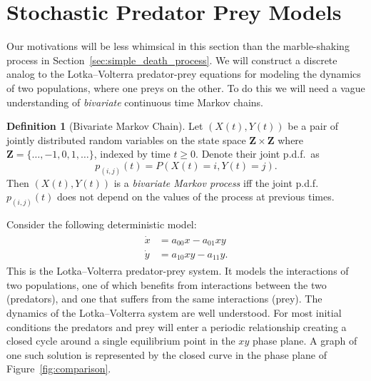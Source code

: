 \documentclass[12pt]{article}
\theoremstyle{definition}
\newtheorem{defn}{Definition}
\begin{document}
\section{Stochastic Predator Prey Models}
\label{sec:stochastic_predator_prey}

Our motivations will be less whimsical in this section than the marble-shaking
process in Section~\ref{sec:simple_death_process}. We will construct a discrete
analog to the Lotka--Volterra predator-prey equations for modeling the dynamics
of two populations, where one preys on the other. To do this we will need a
vague understanding of \emph{bivariate} continuous time Markov chains.

\begin{defn}[Bivariate Markov Chain]
    \label{defn:bivariate-process}
    Let $(X(t), Y(t))$ be a pair of jointly distributed random variables on the
    state space $\mathbf{Z} \times \mathbf{Z}$ where $\mathbf{Z} = \{\dots, -1,
    0, 1, \dots\}$, indexed by time $t \geq 0$.
    Denote their joint p.d.f.~as $$p_{(i, j)}(t) = P(X(t) = i, Y(t) = j).$$
    Then $(X(t), Y(t))$ is a \emph{bivariate Markov process} iff the joint
    p.d.f.~$p_{(i, j)}(t)$ does not depend on the values of the process at
    previous times.
\end{defn}

Consider the following deterministic model:
\begin{align}
\label{eqn:lotka-volterra}
\begin{split}
    \dot{x} &= a_{00} x - a_{01} xy \\
    \dot{y} &= a_{10} xy - a_{11} y.
\end{split}
\end{align}
This is the Lotka--Volterra predator-prey system. It models the interactions of
two populations, one of which benefits from interactions between the two
(predators), and one that suffers from the same interactions (prey). The
dynamics of the Lotka--Volterra system are well understood. For most initial
conditions the predators and prey will enter a periodic relationship creating a
closed cycle around a single equilibrium point in the $xy$ phase plane. A graph
of one such solution is represented by the closed curve in the phase plane of
Figure~\ref{fig:comparison}.
\end{document}
